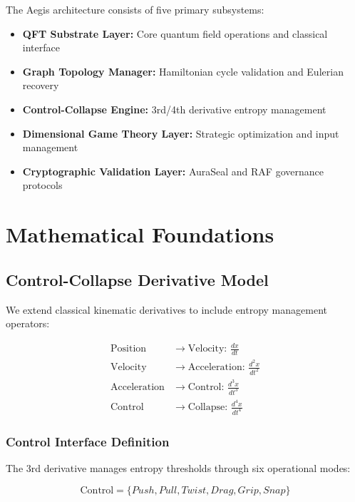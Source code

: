 \documentclass[12pt]{article}
\begin{document}
The Aegis architecture consists of five primary subsystems:

\begin{itemize}
    \item \textbf{QFT Substrate Layer:} Core quantum field operations and classical interface
    \item \textbf{Graph Topology Manager:} Hamiltonian cycle validation and Eulerian recovery
    \item \textbf{Control-Collapse Engine:} 3rd/4th derivative entropy management
    \item \textbf{Dimensional Game Theory Layer:} Strategic optimization and input management
    \item \textbf{Cryptographic Validation Layer:} AuraSeal and RAF governance protocols
\end{itemize}

\section{Mathematical Foundations}

\subsection{Control-Collapse Derivative Model}

We extend classical kinematic derivatives to include entropy management operators:

\begin{align}
\text{Position} &\rightarrow \text{Velocity: } \frac{dx}{dt} \\
\text{Velocity} &\rightarrow \text{Acceleration: } \frac{d^2x}{dt^2} \\
\text{Acceleration} &\rightarrow \text{Control: } \frac{d^3x}{dt^3} \\
\text{Control} &\rightarrow \text{Collapse: } \frac{d^4x}{dt^4}
\end{align}

\subsubsection{Control Interface Definition}

The 3rd derivative manages entropy thresholds through six operational modes:

\begin{equation}
\text{Control} = \{Push, Pull, Twist, Drag, Grip, Snap\}
\end{equation}
\end{document}
